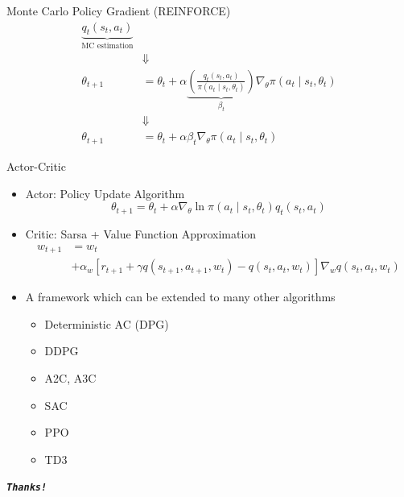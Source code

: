 \documentclass[UTF8, 10pt]{beamer}
\begin{document}
\begin{CJK*}{UTF8}{gbsn}
\begin{frame}{Monte Carlo Policy Gradient (REINFORCE)}
$$\begin{aligned}
	\underbrace{q_{t}\left(s_{t}, a_{t}\right)}_{\text{MC estimation}}
	\\& \Downarrow \\
	\theta_{t+1}&=\theta_{t}+\alpha \underbrace{\left(\frac{q_{t}\left(s_{t}, a_{t}\right)}{\pi\left(a_{t} \mid s_{t}, \theta_{t}\right)}\right)}_{\beta_{t}} \nabla_{\theta} \pi\left(a_{t} \mid s_{t}, \theta_{t}\right) 
	\\& \Downarrow \\
	\theta_{t+1}&=\theta_{t}+\alpha \beta_{t} \nabla_{\theta} \pi\left(a_{t} \mid s_{t}, \theta_{t}\right)
	\end{aligned} 
	$$
\end{frame}
\begin{frame}{Actor-Critic}
	\begin{itemize}
		\item Actor: Policy Update Algorithm
			$$
			\theta_{t+1}=\theta_{t}+\alpha \nabla_{\theta} \ln \pi\left(a_{t} \mid s_{t}, \theta_{t}\right) q_{t}\left(s_{t}, a_{t}\right)
			$$
		\item Critic: Sarsa + Value Function Approximation
			$$
			\begin{aligned}
			w_{t+1}&=w_{t}
			\\
			&+\alpha_{w}\left[r_{t+1}+\gamma q\left(s_{t+1}, a_{t+1}, w_{t}\right)-q\left(s_{t}, a_{t}, w_{t}\right)\right] \nabla_{w} q\left(s_{t}, a_{t}, w_{t}\right)
			\end{aligned}
			$$
		\item A framework which can be extended to many other algorithms
			
			\begin{itemize}
				\item Deterministic AC (DPG)
				\item DDPG
				\item A2C, A3C
				\item SAC
				\item PPO
				\item TD3
			\end{itemize}
	\end{itemize}
\end{frame}



\begin{frame}[allowframebreaks]%
	\begin{center}
		\Huge\textbf{\textit{\texttt{Thanks!}}}
	\end{center}
\end{frame}


\end{CJK*}
\end{document}
